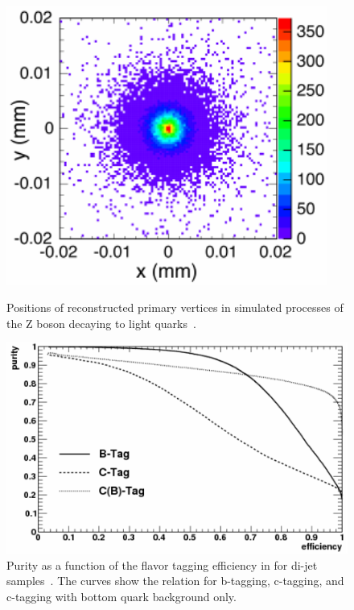 \begin{figure}[h!]
\centering
 \begin{minipage}[t]{0.44\textwidth}
 \centering
\includegraphics[width=0.94\textwidth]{Figures/Vertex_resolution.pdf}
\caption[Plot of reconstructed \sid vertex positions]{Positions of reconstructed primary vertices in simulated processes of the Z boson decaying to light quarks~\cite[p. 148]{TDR4}.}
\label{fig:vertex_res}
\end{minipage}
\hfill
\begin{minipage}[t]{0.55\textwidth}
\centering
\includegraphics[width=\textwidth]{Figures/flavor_tagging_eff.pdf}
\caption[Flavor tagging purity vs. efficiency in \sid]{Purity as a function of the flavor tagging efficiency in \sid for di-jet samples~\cite[p. 99]{LOI}.
The curves show the relation for b-tagging, c-tagging, and c-tagging with bottom quark background only.}
\label{fig:tagging}
\end{minipage}
\end{figure}
\FloatBarrier


